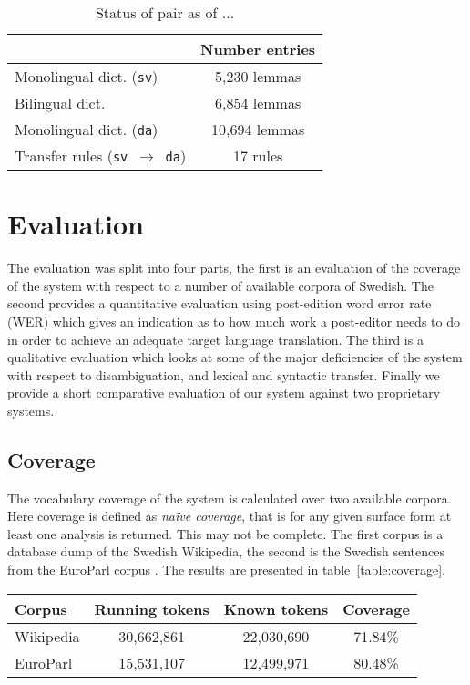 \documentclass[11pt]{article}
\begin{document}
\begin{table}
\centering
\begin{tabular}{|l|c|}
\hline
                                           & Number entries\\
\hline
Monolingual dict. ({\tt sv})               & 5,230 lemmas \\
Bilingual dict.                            & 6,854 lemmas \\
Monolingual dict. ({\tt da})               & 10,694 lemmas \\
Transfer rules ({\tt sv $\rightarrow$ da}) & 17 rules \\
\hline
\end{tabular}
    \caption{Status of pair as of ...}
    \label{table:status}
\end{table}

\section{Evaluation}

The evaluation was split into four parts, the first is an evaluation of the coverage
of the system with respect to a number of available corpora of Swedish. The second
provides a quantitative evaluation using post-edition word error rate (WER) which 
gives an indication as to how much work a post-editor needs to do in order to 
achieve an adequate target language translation. The third is a qualitative evaluation
which looks at some of the major deficiencies of the system with respect to disambiguation,
and lexical and syntactic transfer. Finally we provide a short comparative evaluation of
our system against two proprietary systems.

\subsection{Coverage}

The vocabulary coverage of the system is calculated over two available corpora. Here coverage
is defined as \emph{na\"ive coverage}, that is for any given surface form at least one analysis
is returned. This may not be complete. The first corpus is a database dump of the Swedish 
Wikipedia, the second is the Swedish sentences from the EuroParl corpus \cite{Koehn2005}. The 
results are presented in table~\ref{table:coverage}.

\begin{table*}
\centering
\begin{tabular}{|l|c|c|c|}
\hline
Corpus & Running tokens & Known tokens & Coverage \\
\hline
Wikipedia  & 30,662,861 & 22,030,690 & 71.84\%\\
EuroParl   & 15,531,107 & 12,499,971 & 80.48\%\\
\hline
\end{tabular}
    \caption{Naïve coverage for two corpora}
    \label{table:coverage}
\end{table*}
\end{document}
